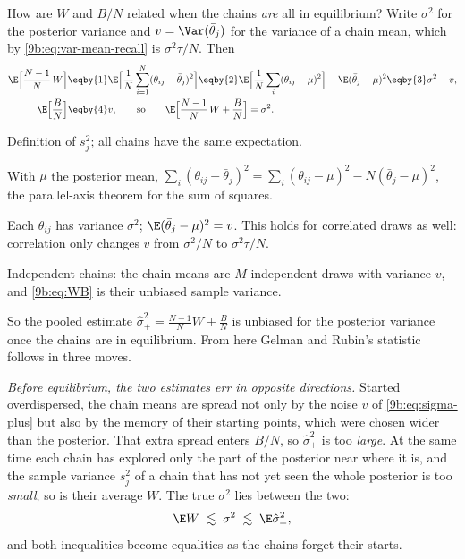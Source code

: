 How are $W$ and $B/N$ related when the chains \emph{are} all in equilibrium? Write $\sigma^2$ for
the posterior variance and $v=\Var(\bar\theta_j)$ for the variance of a chain mean, which by
\eqref{9b:eq:var-mean-recall} is $\sigma^2\tau/N$. Then
\begin{align}
  \E\Bigl[\frac{N-1}{N}\,W\Bigr]
  &\eqby{1}\E\Bigl[\frac1N\sum_{i=1}^N(\theta_{ij}-\bar\theta_j)^2\Bigr]
   \eqby{2}\E\Bigl[\frac1N\sum_{i}(\theta_{ij}-\mu)^2\Bigr]-\E(\bar\theta_j-\mu)^2
   \eqby{3}\sigma^2-v,
  \nonumber\\
  \E\Bigl[\frac BN\Bigr]
  &\eqby{4}v,
  \qquad\text{so}\qquad
  \E\Bigl[\frac{N-1}{N}\,W+\frac BN\Bigr]=\sigma^2 .
  \label{9b:eq:sigma-plus}
\end{align}
\begin{explain}
  \item Definition of $s_j^2$; all chains have the same expectation.
  \item With $\mu$ the posterior mean,
        $\sum_i(\theta_{ij}-\bar\theta_j)^2=\sum_i(\theta_{ij}-\mu)^2-N(\bar\theta_j-\mu)^2$,
        the parallel-axis theorem for the sum of squares.
  \item Each $\theta_{ij}$ has variance $\sigma^2$; $\E(\bar\theta_j-\mu)^2=v$. This holds for
        correlated draws as well: correlation only changes $v$ from $\sigma^2/N$
        to $\sigma^2\tau/N$.
  \item Independent chains: the chain means are $M$ independent draws with variance $v$, and
        \eqref{9b:eq:WB} is their unbiased sample variance.
\end{explain}
So the pooled estimate $\hat\sigma^2_+=\frac{N-1}NW+\frac BN$ is unbiased for the posterior
variance once the chains are in equilibrium. From here Gelman and Rubin's statistic follows in
three moves.

\emph{Before equilibrium, the two estimates err in opposite directions.} Started overdispersed,
the chain means are spread not only by the noise $v$ of \eqref{9b:eq:sigma-plus} but also by the
memory of their starting points, which were chosen wider than the posterior. That extra spread
enters $B/N$, so $\hat\sigma^2_+$ is too \emph{large}. At the same time each chain has explored
only the part of the posterior near where it is, and the sample variance $s_j^2$ of a chain that
has not yet seen the whole posterior is too \emph{small}; so is their average $W$. The true
$\sigma^2$ lies between the two:
\begin{equation*}
  \E W\;\lesssim\;\sigma^2\;\lesssim\;\E\hat\sigma^2_+ ,
\end{equation*}
and both inequalities become equalities as the chains forget their starts.

